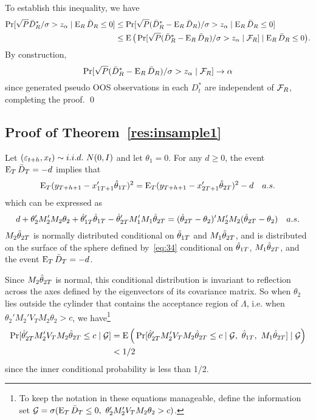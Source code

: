 \documentclass[12pt,draft]{article}
\begin{document}
To establish this inequality, we have
\begin{align*}
  \Pr[\sqrt{P} \bar{D}_{R}^* / \sigma > z_\alpha \mid \operatorname{E}_R \bar{D}_{R} \leq 0]
  &\leq \Pr[\sqrt{P} (\bar{D}_{R}^* - \operatorname{E}_R \bar{D}_{R}) / \sigma > z_\alpha
  \mid \operatorname{E}_R \bar{D}_{R} \leq 0] \\
  &\leq \operatorname{E}\big(
  \Pr[\sqrt{P} (\bar{D}_{R}^* - \operatorname{E}_R \bar{D}_{R}) / \sigma > z_\alpha \mid \mathcal{F}_R]
  \mid \operatorname{E}_R \bar{D}_{R} \leq 0\big).
\end{align*}
By construction,
\begin{equation*}
  \Pr[\sqrt{P} (\bar{D}_{R}^* - \operatorname{E}_R \bar{D}_{R}) / \sigma > z_\alpha \mid \mathcal{F}_R]
  \to \alpha
\end{equation*}
since generated pseudo OOS observations in each $D_t^*$ are
independent of $\mathcal{F}_R$, completing the proof.
\qed

\subsection*{Proof of Theorem~\ref{res:insample1}}

Let $(\e_{t+h}, x_{t}) \sim i.i.d.\ N(0,I)$ and let $\theta_1 = 0$.
For any $d \geq 0$, the event $\operatorname{E}_T \bar{D}_{T} = -d$ implies that
\begin{equation*}
  \operatorname{E}_T (y_{T+h+1} - x_{1T+1}'\hat\theta_{1T})^2
  = \operatorname{E}_T (y_{T+h+1} - x_{2T+1}'\hat\theta_{2T})^2 - d \quad a.s.
\end{equation*}
which can be expressed as
\begin{equation}\label{eq:34}
  d + \theta_2'M_2' M_2 \theta_2 + \hat\theta_{1T}'\hat\theta_{1T} - \hat\theta_{2T}'M_1'M_1\hat\theta_{2T}
  = (\hat\theta_{2T} - \theta_2)' M_2'M_2 (\hat\theta_{2T} - \theta_2) \quad a.s.
\end{equation}
$M_2 \hat\theta_{2T}$ is normally distributed conditional on $\hat\theta_{1T}$ and
$M_1 \hat\theta_{2T}$, and is distributed on the surface of the sphere defined
by~\eqref{eq:34} conditional on $\hat\theta_{1T}$, $M_1 \hat\theta_{2T}$, and the
event $\operatorname{E}_T \bar{D}_{T} = -d$.

Since $M_2 \hat\theta_{2T}$ is normal, this conditional distribution is
invariant to reflection across the axes defined by the eigenvectors of
its covariance matrix. So when $\theta_2$ lies outside the cylinder
that contains the acceptance region of $\Lambda$, i.e. when
$\theta_2'M_2' V_T M_2 \theta_2 > c$, we have\footnote{%
  To keep the notation in these equations manageable, define the
  information set
  $\mathcal{G} = \sigma(\operatorname{E}_T \bar{D}_{T} \leq 0,~ \theta_2'M_2' V_T M_2 \theta_2 >
  c)$.} %
\begin{align*}
  \Pr[ \hat\theta_{2T}' M_2' V_T M_2 \hat\theta_{2T} \leq c \mid \mathcal{G}]
  &= \operatorname{E}\Big( \Pr[ \hat\theta_{2T}'M_2' V_T M_2 \hat\theta_{2T} \leq c \mid \mathcal{G},~\hat\theta_{1T},~M_1 \hat\theta_{2T}] \mid \mathcal{G} \Big) \\
  & < 1/2
\end{align*}
since the inner conditional probability is less than 1/2.
\end{document}
